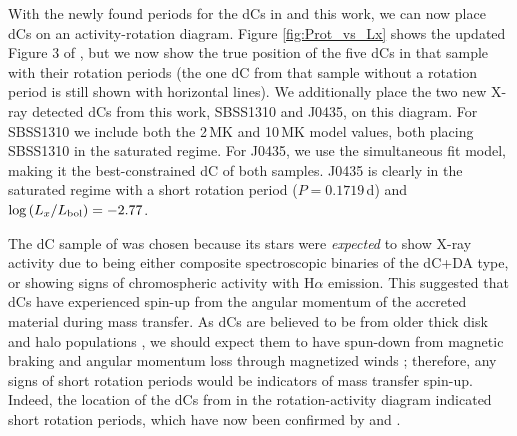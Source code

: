 \documentclass[twocolumn, tighten, times, astrosymb]{aastex631}
\begin{document}
\begin{figure*}
\centering
\caption{Updated activity-rotation figure from \citet{Green2019}. For context, the activity and rotation for normal (C/O~$< 1$) main-sequence stars are shown in the background. The logarithm of X-ray to bolometric luminosity is plotted against rotation period for the normal dwarf stars from the samples of: \citet{Wright2011}, \citet{Stelzer2016}, and \citet{Wright2018}. We show the dCs from the \citet{Green2019} \Chandra\ sample and use the recently found rotation periods from \citet{Roulston2021a} and \citet{Whitehouse2021} to place those dCs at their true location on the diagram, assuming both 2MK and 10MK APEC plasma models for X-ray emission.  The X-ray detected dC J1548 from the \citet{Green2019} sample does not have a rotation period and so is marked by horizontal dashed lines. Finally, we show the two dCs with new X-ray detections reported in this paper, J0435 and SBSS1310, as well as the $3\sigma$ upper limits for the three non-detections. The rotation period for SBS1310 comes from \citet{Roulston2021a}, and the rotation period for J0435 is from this paper. For J0435, we use the simultaneous best-fit X-ray model of 13.4MK (section \ref{sec:J0435_indfit}).  It is clear that for either $2$\,MK and $10$\,MK models, most dCs are found in the saturated regime of active stars.}
\label{fig:Prot_vs_Lx}
\end{figure*}

With the newly found periods for the dCs in \citet{Green2019} and this work, we can now place dCs on an activity-rotation diagram. Figure \ref{fig:Prot_vs_Lx} shows the updated Figure 3 of \citet{Green2019}, but we now show the true position of the five dCs in that sample with their rotation periods (the one dC from that sample without a rotation period is still shown with horizontal lines). We additionally place the two new X-ray detected dCs from this work, SBSS1310 and J0435, on this diagram. For SBSS1310 we include both the 2\,MK and 10\,MK model values, both placing SBSS1310 in the saturated regime. For J0435, we use the simultaneous fit model, making it the best-constrained dC of both samples. J0435 is clearly in the saturated regime with a short rotation period ($P=0.1719$\,d) and $\log{(\LxLbol)} = -2.77$.

The dC sample of \citet{Green2019} was chosen because its stars were \textit{expected} to show X-ray activity due to being either composite spectroscopic binaries of the dC+DA type, or showing signs of chromospheric activity with H$\alpha$ emission. This suggested that dCs have experienced spin-up from the angular momentum of the accreted material during mass transfer. As dCs are believed to be from older thick disk and halo populations \citep{Green2013, Farihi2018}, we should expect them to have spun-down from magnetic braking and angular momentum loss through magnetized winds \citep{Kraft1967, Matt2015, Garraffo2018}; therefore, any signs of short rotation periods would be indicators of mass transfer spin-up. Indeed, the location of the dCs from \citet{Green2019} in the rotation-activity diagram indicated short rotation periods, which have now been confirmed by \citet{Roulston2021a} and \citet{Whitehouse2021}. 
\end{document}
